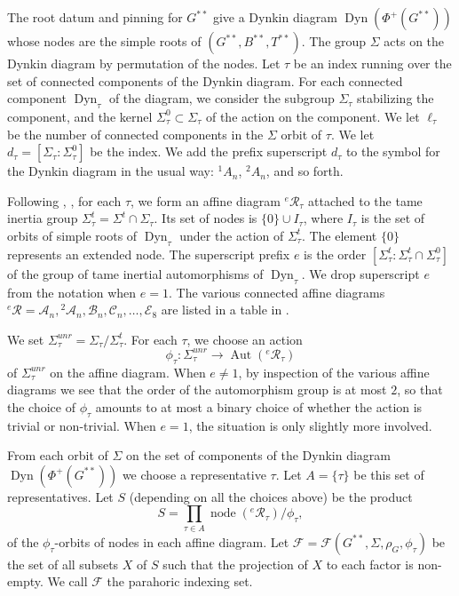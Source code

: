\documentclass[12pt]{amsart}
\newcommand{\op}[1]{\operatorname{#1}}
\newcommand{\cal}[1]{\mathcal{#1}}
\def\R{\cal{R}}
\newcommand{\cF}{\mathcal{F}}
\theoremstyle{plain}
\theoremstyle{definition}
\begin{document}
The root datum and pinning for $G^{**}$ give a Dynkin diagram
$\op{Dyn}(\Phi^+(G^{**}))$ whose nodes are the simple roots of
$(G^{**},B^{**},T^{**})$.  The group $\Sigma$ acts on the Dynkin
diagram by permutation of the nodes.  Let $\tau$ be an index running
over the set of connected components of the Dynkin diagram.  For each
connected component $\op{Dyn}_\tau$ of the diagram, we consider the
subgroup $\Sigma_\tau$ stabilizing the component, and the kernel
$\Sigma^0_\tau\subset \Sigma_\tau$ of the action on the component.
We let $\ell_\tau$ be the number of connected components in the
$\Sigma$ orbit of $\tau$.  We let $d_\tau =
[\Sigma_\tau:\Sigma_\tau^0]$ be the index.  We add the prefix
superscript $d_\tau$ to the symbol for the Dynkin diagram in the
usual way: ${}^1A_n$, ${}^2A_n$, and so forth.

Following \cite{reeder2010torsion}, \cite{Gross}, for each $\tau$, we form an
affine diagram ${}^e\R_\tau$ attached to the tame inertia group
$\Sigma^t_\tau = \Sigma^t\cap \Sigma_\tau$.  Its set of nodes is
$\{0\}\cup I_\tau$, where $I_\tau$ is the set of orbits of simple roots of
$\op{Dyn}_\tau$ under the action of $\Sigma^t_\tau$.  The element
$\{0\}$ represents an extended node.  The superscript prefix $e$ is
the order $[\Sigma^t_\tau:\Sigma^t_\tau\cap \Sigma_\tau^0]$ of
the group of tame inertial automorphisms of $\op{Dyn}_\tau$.  We
drop superscript $e$ from the notation when $e=1$.  The various
connected affine diagrams ${}^e\R = \cal{A}_n, {}^2\cal{A}_n,
\cal{B}_n, \cal{C}_n,\ldots, \cal{E}_8$ are listed in a table in
\cite{Gross}.

We set $\Sigma^{unr}_\tau = \Sigma_\tau/\Sigma^t_\tau$.
For each $\tau$, we choose an action
\[
\phi_\tau:\Sigma^{unr}_\tau\to \op{Aut}({}^e\R_\tau)
\]
of $\Sigma^{unr}_\tau$ on the affine diagram.  When $e\ne 1$, by
inspection of the various affine diagrams we see that the order of the
automorphism group is at most $2$, so that the choice of $\phi_\tau$
amounts to at most a binary choice of whether the action is trivial or
non-trivial.  When $e=1$, the situation is only slightly more
involved.

From each orbit of $\Sigma$ on the set of components of the Dynkin
diagram $\op{Dyn}(\Phi^+(G^{**}))$ we choose a representative
$\tau$.  Let $A = \{\tau\}$ be this set of representatives.  Let
$S$ (depending on all the choices above) be the product
\[
S = \prod_{\tau\in A} \op{node}({}^e\R_\tau)/\phi_\tau,
\]
of the $\phi_\tau$-orbits of nodes in each affine diagram.  Let $\cF
= \cF(G^{**},\Sigma,\rho_G,\phi_\tau)$ be the set of all
subsets $X$ of $S$ such that the projection of $X$ to each factor is
non-empty.  We call $\cF$ the parahoric indexing set.
\end{document}
